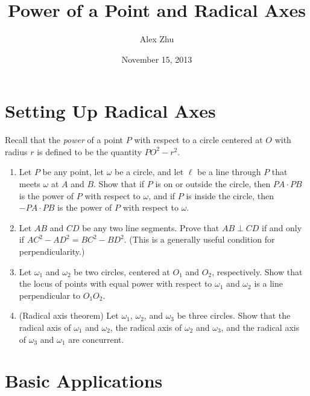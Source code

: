 \documentclass[11pt]{article}
\begin{document}
\title{Power of a Point and Radical Axes}
\author{Alex Zhu}
\date{November 15, 2013}

\maketitle

\section{Setting Up Radical Axes}

Recall that the \emph{power} of a point $P$ with respect to a circle centered at $O$ with radius $r$ is defined to be the quantity $PO^2 - r^2$. 

\begin{enumerate}
  \item Let $P$ be any point, let $\omega$ be a circle, and let $\ell$ be a line through $P$ that meets $\omega$ at $A$ and $B$. Show that if $P$ is on or outside the circle, then $PA \cdot PB$ is the power of $P$ with respect to $\omega$, and if $P$ is inside the circle, then $-PA \cdot PB$ is the power of $P$ with respect to $\omega$. 

  \item Let $AB$ and $CD$ be any two line segments. Prove that $AB \perp CD$ if and only if $AC^2 - AD^2 = BC^2 - BD^2$. (This is a generally useful condition for perpendicularity.) 
  
  \item Let $\omega_1$ and $\omega_2$ be two circles, centered at $O_1$ and $O_2$, respectively. Show that the locus of points with equal power with respect to $\omega_1$ and $\omega_2$ is a line perpendicular to $O_1 O_2$. 
  
  \item (Radical axis theorem) Let $\omega_1$, $\omega_2$, and $\omega_3$ be three circles. Show that the radical axis of $\omega_1$ and $\omega_2$, the radical axis of $\omega_2$ and $\omega_3$, and the radical axis of $\omega_3$ and $\omega_1$ are concurrent. 
\end{enumerate}

\section{Basic Applications}
\end{document}
